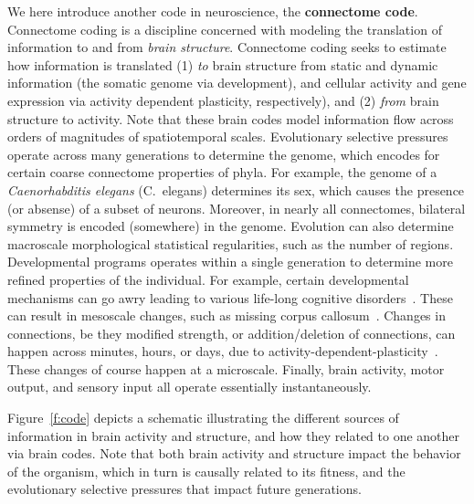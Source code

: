 \documentclass[11pt]{article}
\begin{document}
We here introduce another code in neuroscience, the \textbf{connectome code}.  
Connectome coding is a discipline concerned with modeling the translation of information  to and from  \emph{brain  structure}.
Connectome coding seeks to estimate how information is translated (1) \emph{to} brain structure from static and dynamic information  (the somatic genome via development),  and cellular activity and gene expression via   activity dependent plasticity, respectively), and (2) \emph{from} brain structure to activity.
Note that these brain codes model information flow across orders of magnitudes of spatiotemporal scales.  
Evolutionary selective pressures operate across many generations to determine the genome, which encodes for certain coarse connectome properties of phyla.  
For example, the genome of a \emph{Caenorhabditis elegans} (C.~elegans) determines its sex, which causes the presence (or absense) of a subset of neurons.  
Moreover, in nearly all connectomes, bilateral symmetry is encoded (somewhere) in the genome. 
Evolution can also determine macroscale morphological statistical  regularities, such as the number of regions.
Developmental programs operates within a single generation to determine more refined properties of the individual.
For example,  certain developmental mechanisms can go awry leading to various life-long  cognitive disorders~\cite{Karmiloff-Smith2018-ih}.
These can result in mesoscale changes, such as missing corpus callosum~\cite{Paul2007-vy}.
Changes in connections, be they modified strength, or addition/deletion of connections, can happen across minutes, hours, or days, due to  activity-dependent-plasticity~\cite{Carulli2011-pb}. These changes of course happen at a microscale.
Finally, brain activity,  motor output, and sensory input all operate essentially instantaneously.
% 

Figure~\ref{f:code} depicts  a schematic illustrating the different sources of information in brain activity and structure, and how they related to one another via brain codes.  
% 
% 
Note that both brain activity and structure impact the  behavior of the organism, which in turn is causally related to its fitness, and the evolutionary selective pressures that impact future generations. 
\end{document}
